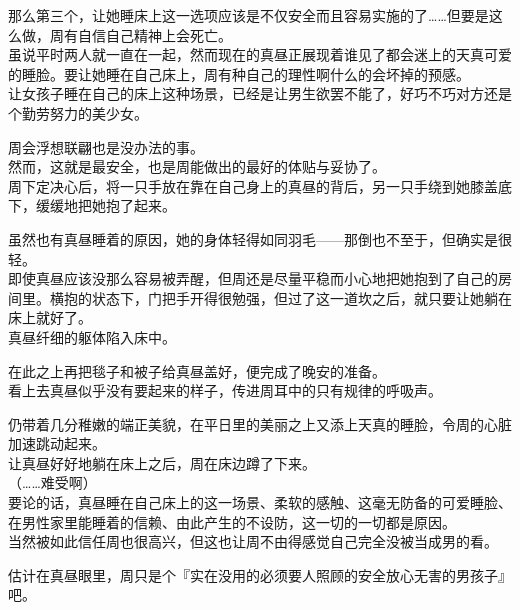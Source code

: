那么第三个，让她睡床上这一选项应该是不仅安全而且容易实施的了……但要是这么做，周有自信自己精神上会死亡。\\

虽说平时两人就一直在一起，然而现在的真昼正展现着谁见了都会迷上的天真可爱的睡脸。要让她睡在自己床上，周有种自己的理性啊什么的会坏掉的预感。\\

让女孩子睡在自己的床上这种场景，已经是让男生欲罢不能了，好巧不巧对方还是个勤劳努力的美少女。

周会浮想联翩也是没办法的事。\\

然而，这就是最安全，也是周能做出的最好的体贴与妥协了。\\

周下定决心后，将一只手放在靠在自己身上的真昼的背后，另一只手绕到她膝盖底下，缓缓地把她抱了起来。

虽然也有真昼睡着的原因，她的身体轻得如同羽毛——那倒也不至于，但确实是很轻。\\

即使真昼应该没那么容易被弄醒，但周还是尽量平稳而小心地把她抱到了自己的房间里。横抱的状态下，门把手开得很勉强，但过了这一道坎之后，就只要让她躺在床上就好了。\\

真昼纤细的躯体陷入床中。

在此之上再把毯子和被子给真昼盖好，便完成了晚安的准备。\\

看上去真昼似乎没有要起来的样子，传进周耳中的只有规律的呼吸声。

仍带着几分稚嫩的端正美貌，在平日里的美丽之上又添上天真的睡脸，令周的心脏加速跳动起来。\\%

让真昼好好地躺在床上之后，周在床边蹲了下来。\\

（……难受啊）\\

要论的话，真昼睡在自己床上的这一场景、柔软的感触、这毫无防备的可爱睡脸、在男性家里能睡着的信赖、由此产生的不设防，这一切的一切都是原因。\\

当然被如此信任周也很高兴，但这也让周不由得感觉自己完全没被当成男的看。

估计在真昼眼里，周只是个『实在没用的必须要人照顾的安全放心无害的男孩子』吧。\\

